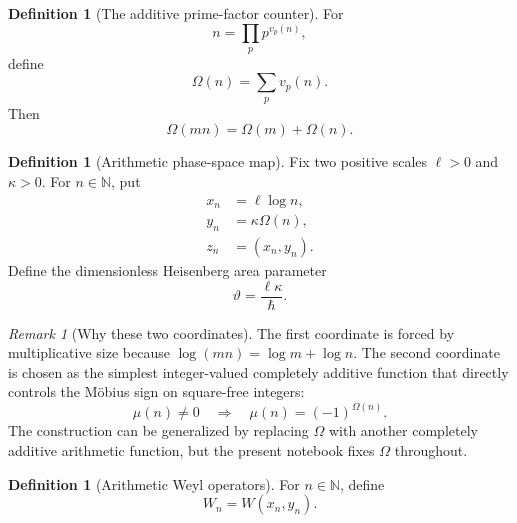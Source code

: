 \documentclass[11pt]{amsart}
\numberwithin{equation}{section}
\theoremstyle{plain}
\theoremstyle{definition}
\newtheorem{definition}[theorem]{Definition}
\theoremstyle{remark}
\newtheorem{remark}[theorem]{Remark}
\newcommand{\N}{\mathbb{N}}
\newcommand{\Om}{\Omega}
\begin{document}
\begin{definition}[The additive prime-factor counter]
\label{def:Omega}
For
\begin{equation}
n=\prod_p p^{v_p(n)},
\label{eq:prime_factorization}
\end{equation}
define
\begin{equation}
\Om(n)=\sum_p v_p(n).
\label{eq:Omega_definition}
\end{equation}
Then
\begin{equation}
\Om(mn)=\Om(m)+\Om(n).
\label{eq:Omega_additivity}
\end{equation}
\end{definition}

\begin{definition}[Arithmetic phase-space map]
\label{def:arithmetic_phase_space_map}
Fix two positive scales $\ell>0$ and $\kappa>0$.  For $n\in\N$, put
\begin{align}
x_n
&=\ell\log n,
\label{eq:xn_definition}\\
y_n
&=\kappa\Om(n),
\label{eq:yn_definition}\\
z_n
&=(x_n,y_n).
\label{eq:zn_definition}
\end{align}
Define the dimensionless Heisenberg area parameter
\begin{equation}
\vartheta=\frac{\ell\kappa}{\hbar}.
\label{eq:theta_definition}
\end{equation}
\end{definition}

\begin{remark}[Why these two coordinates]
\label{rem:why_coordinates}
The first coordinate is forced by multiplicative size because
$\log(mn)=\log m+\log n$.  The second coordinate is chosen as the simplest
integer-valued completely additive function that directly controls the
M\"obius sign on square-free integers:
\begin{equation}
\mu(n)\neq0
\quad\Longrightarrow\quad
\mu(n)=(-1)^{\Om(n)}.
\label{eq:mobius_Omega_relation}
\end{equation}
The construction can be generalized by replacing $\Om$ with another
completely additive arithmetic function, but the present notebook fixes $\Om$ throughout.
\end{remark}

\begin{definition}[Arithmetic Weyl operators]
\label{def:arithmetic_weyl_operator}
For $n\in\N$, define
\begin{equation}
W_n=W(x_n,y_n).
\label{eq:Wn_definition}
\end{equation}
\end{definition}
\end{document}
